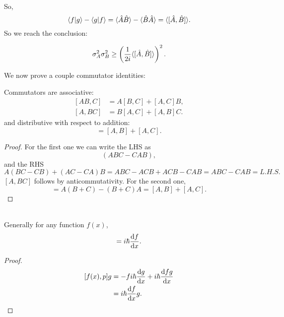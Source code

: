 So, 
\begin{equation}
\langle f|g\rangle- \langle g|f\rangle=\langle \hat{A}\hat{B}\rangle-\langle \hat{B}\hat{A}\rangle=\langle [\hat{A},\hat{B}]\rangle.
\end{equation}
So we reach the conclusion: 
\begin{thrm}
\label{gen_uncertp}
\begin{equation}
\sigma_A^2\sigma_B^2\geq\left(\frac{1}{2i}\langle [\hat{A},\hat{B}]\rangle \right)^2.
\end{equation}
\end{thrm}
We now prove a couple commutator identities: 
\begin{prt}
\label{com_id}
Commutators are associative:
\begin{subequations}
\begin{align}
[AB,C]&=A[B,C]+[A,C]B, \\
[A,BC]&=B[A,C]+[A,B]C.
\end{align}
\end{subequations}
and distributive with respect to addition:
\begin{equation}
[A,B+C]=[A,B]+[A,C]. 
\end{equation}
\end{prt}
\begin{proof}
For the first one we can write the LHS as
\begin{equation}
(ABC-CAB), 
\end{equation}
and the RHS
\begin{equation}
A(BC-CB)+(AC-CA)B=ABC-ACB+ACB-CAB=ABC-CAB=L.H.S.
\end{equation}
$[A,BC]$ follows by anticommutativity. 
For the second one, 
\begin{equation}
[A,B+C]=A(B+C)-(B+C)A=[A,B]+[A,C]. 
\end{equation}
\end{proof}
\begin{prt}
\ \\
Generally for any function $f(x)$,
\begin{equation}
[f(x),p]=i\hbar\diff fx.
\end{equation}
\end{prt}
\begin{proof}
\begin{subequations}
\begin{align}
[f(x),p]g&=-fi\hbar\diff gx+i\hbar\diff{fg}{x}\\
&=i\hbar\diff fx g.
\end{align}
\end{subequations}
\end{proof}
